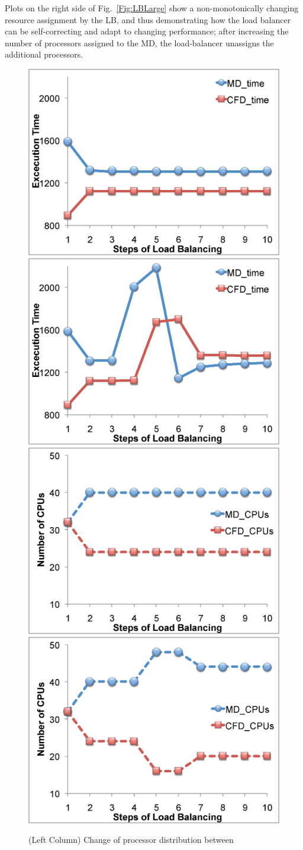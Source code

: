 \documentclass[preprint,12pt]{elsarticle}
\begin{document}
Plots on the right side of Fig.~\ref{Fig:LBLarge} show a non-monotonically changing resource assignment by the LB, and thus demonstrating how the load balancer can be self-correcting and adapt to changing performance; after increasing the number of processors assigned to the MD, the load-balancer unassigns the additional processors.


\begin{figure}
\centering
\includegraphics[width=0.4\linewidth]{fig7_11.eps}
\includegraphics[width=0.4\linewidth]{fig7_21.eps}
\linebreak
\includegraphics[width=0.4\linewidth]{fig7_12.eps}
\includegraphics[width=0.4\linewidth]{fig7_22.eps}
\caption{\small (Left Column) Change of processor distribution between
}
\end{figure}
\end{document}
